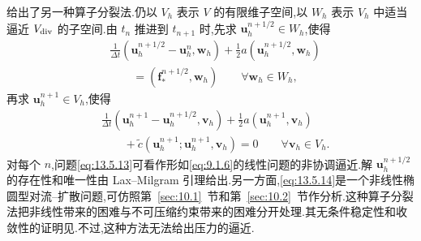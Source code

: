 给出了另一种算子分裂法.仍以 \(V_h\) 表示 \(V\) 的有限维子空间,以 \(W_h\) 表示 \(V_h\) 中适当逼近 \(V_{\rm div}\) 的子空间.由 \(t_n\) 推进到 \(t_{n+1}\) 时,先求 \(\boldsymbol{u}_h^{n+1/2}\in W_h\),使得
\begin{equation}\label{eq:13.5.13}
  \begin{aligned}
    &\frac1{\Delta t}(\boldsymbol{u}_h^{n+1/2}-\boldsymbol{u}_h^n,\boldsymbol{w}_h)
         +\tfrac12a(\boldsymbol{u}_h^{n+1/2},\boldsymbol{w}_h)\\
    &\qquad=(\boldsymbol{f}_*^{n+1/2},\boldsymbol{w}_h)\qquad\forall\boldsymbol{w}_h\in W_h,
  \end{aligned}
\end{equation}
再求 \(\boldsymbol{u}_h^{n+1}\in V_h\),使得
\begin{equation}\label{eq:13.5.14}
  \begin{aligned}
    &\frac1{\Delta t}(\boldsymbol{u}_h^{n+1}-\boldsymbol{u}_h^{n+1/2},\boldsymbol{v}_h)
         +\tfrac12a(\boldsymbol{u}_h^{n+1},\boldsymbol{v}_h)\\
    &\qquad+\widetilde c(\boldsymbol{u}_h^{n+1};\boldsymbol{u}_h^{n+1},\boldsymbol{v}_h)=0
         \qquad\forall\boldsymbol{v}_h\in V_h.
  \end{aligned}
\end{equation}
对每个 \(n\),问题\eqref{eq:13.5.13}可看作形如\eqref{eq:9.1.6}的线性问题的非协调逼近.解 \(\boldsymbol{u}_h^{n+1/2}\) 的存在性和唯一性由 Lax--Milgram 引理给出.另一方面,\eqref{eq:13.5.14}是一个非线性椭圆型对流--扩散问题,可仿照第~\ref{sec:10.1}~节和第~\ref{sec:10.2}~节作分析.这种算子分裂法把非线性带来的困难与不可压缩约束带来的困难分开处理.其无条件稳定性和收敛性的证明见.不过,这种方法无法给出压力的逼近.

